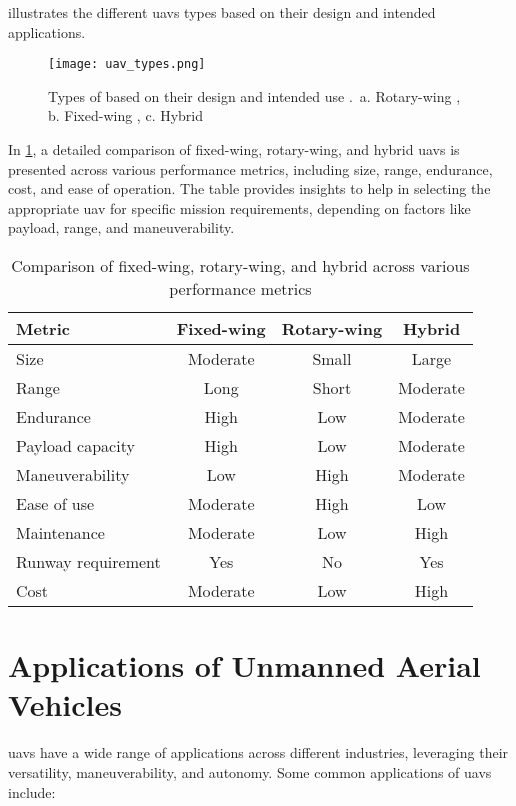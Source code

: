  illustrates the different \glspl{uav} types based on their design and intended applications.

\begin{figure}
  \texttt{[image: uav\_types.png]}
  \caption{Types of  based on their design and intended use \autocite{mohnani2022role}.\ a. Rotary-wing , b. Fixed-wing , c. Hybrid }\label{fig:uav_types}
\end{figure}

In \cref{tab:uav_categories}, a detailed comparison of fixed-wing, rotary-wing, and hybrid \glspl{uav} is presented across various performance metrics, including size, range, endurance, cost, and ease of operation. The table provides insights to help in selecting the appropriate \gls{uav} for specific mission requirements, depending on factors like payload, range, and maneuverability.

\begin{table}
  \begin{tabular}{ l c c c }
    \toprule
    \textbf{Metric} & \textbf{Fixed-wing} & \textbf{Rotary-wing} & \textbf{Hybrid} \\
    \midrule
    Size & Moderate & Small & Large \\
    Range & Long & Short & Moderate \\
    Endurance & High & Low & Moderate \\
    Payload capacity & High & Low & Moderate \\
    Maneuverability & Low & High & Moderate \\
    Ease of use & Moderate & High & Low \\
    Maintenance & Moderate & Low & High \\
    Runway requirement & Yes & No & Yes \\
    Cost & Moderate & Low & High \\
    \bottomrule
  \end{tabular}
  \caption{Comparison of fixed-wing, rotary-wing, and hybrid  across various performance metrics}\label{tab:uav_categories}
\end{table}

\section{Applications of Unmanned Aerial Vehicles}

\glspl{uav} have a wide range of applications across different industries, leveraging their versatility, maneuverability, and autonomy. Some common applications of \glspl{uav} include:

